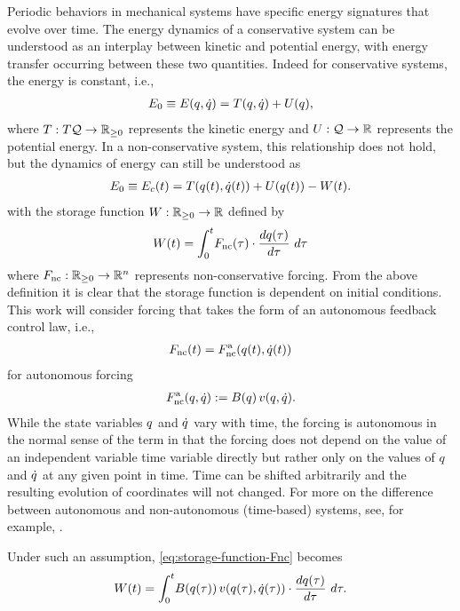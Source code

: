 Periodic behaviors in mechanical systems have specific energy signatures that
evolve over time.
% 
The energy dynamics of a conservative system can be understood as an interplay
between kinetic and potential energy, with energy transfer occurring between
these two quantities.
% 
Indeed for conservative systems, the energy is constant, i.e.,
\begin{align*}
  E_{0} \equiv E(q, \dot{q}) = T(q, \dot{q}) + U(q),
\end{align*}
where $T : T\mathcal{Q} \to \mathbb{R}_{\geq 0}$ represents the kinetic energy and $U : \mathcal{Q} \to \mathbb{R}$
represents the potential energy.
% 
In a non-conservative system, this relationship does not hold, but the dynamics
of energy can still be understood as
\begin{align}
  \label{eq:ncsys-nrg-cons}
  E_{0} \equiv E_{c}(t) = T(q(t), \dot{q}(t)) + U(q(t)) - W(t).
\end{align}
with the storage function $W : \mathbb{R}_{\geq 0} \to \mathbb{R}$ defined by
\begin{align}
  \label{eq:storage-function-Fnc}
  \W\argt = \int_{0}^{t} \! \Fnc\argtau \cdot \frac{d\q\argtau}{d\tau} \ d\tau
\end{align}
where $F_{\mathrm{nc}}: \mathbb{R}_{\geq 0} \to \mathbb{R}^{n}$ represents non-conservative forcing.
% 
From the above definition it is clear that the storage function is dependent on
initial conditions.
% 
This work will consider forcing that takes the form of an autonomous feedback
control law, i.e.,
\begin{align*}
  F_{\mathrm{nc}}(t) = F_{\mathrm{nc}}^{\mathrm{a}}(q(t), \dot{q}(t))
\end{align*}
for autonomous forcing
\begin{align*}
  F_{\mathrm{nc}}^{\mathrm{a}}(q, \dot{q}) := B(q) \, v(q, \dot{q}).
\end{align*}
% 
While the state variables $q$ and $\dot{q}$ vary with time, the forcing is
autonomous in the normal sense of the term in that the forcing does not depend
on the value of an independent variable time variable directly but rather only
on the values of $q$ and $\dot{q}$ at any given point in time.
% 
Time can be shifted arbitrarily and the resulting evolution of coordinates will
not changed.
% 
For more on the difference between autonomous and non-autonomous (time-based)
systems, see, for example, \cite[pp.~63]{Perko2001}.

% 
Under such an assumption, \eqref{eq:storage-function-Fnc} becomes
\begin{align}
  \label{eq:storage-function}
  W(t) = \int_{0}^{t} \! B(q(\tau)) \, v(q(\tau), \dot{q}(\tau)) \cdot
  \frac{dq(\tau)}{d\tau} \ d\tau.
\end{align}


